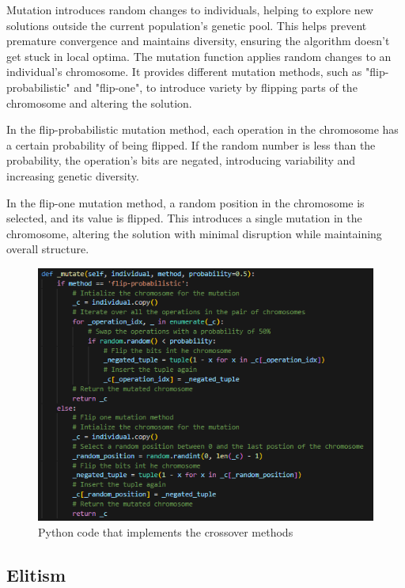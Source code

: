 \documentclass[11pt, a4paper]{article}
\begin{document}
Mutation introduces random changes to individuals, helping to explore new solutions outside the current population's genetic pool. This helps prevent premature 
convergence and maintains diversity, ensuring the algorithm doesn't get stuck in local optima. The mutation function applies random changes to an individual’s chromosome. 
It provides different mutation methods, such as "flip-probabilistic" and "flip-one", to introduce variety by flipping parts of the chromosome and altering the solution.

\vspace{1em} In the flip-probabilistic mutation method, each operation in the chromosome has a certain probability of being flipped. If the random number is less than the probability, 
the operation's bits are negated, introducing variability and increasing genetic diversity.

\vspace{1em} In the flip-one mutation method, a random position in the chromosome is selected, and its value is flipped. This introduces a single mutation in the chromosome, altering 
the solution with minimal disruption while maintaining overall structure.

\begin{figure}[H]
    \centering
    \includegraphics[width=\textwidth]{media/mutation.png}
    \caption{Python code that implements the crossover methods}
    \label{fig:image_10}
\end{figure}

\subsection{Elitism}
\end{document}
